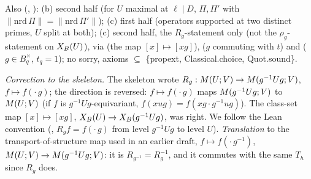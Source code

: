 \begin{proposition}[relations]
Also \stformal{} (, ): (b) second half 
(for $U$ maximal at $\ell\mid D$, $\Pi,\Pi'$ with $\|\mathrm{nrd}\,\Pi\|=\|\mathrm{nrd}\,\Pi'\|$); (c) first half
 (operators supported at two distinct primes, $U$ split at both); (c) second half, the
$R_g$-statement only (not the $\rho_g$-statement on $X_B(U)$), via  (the map $[x]\mapsto[xg]$),
 ($g$ commuting with $t$) and 
($g\in B_q^\times$, $t_q=1$); no sorry, axioms $\subseteq$ \{propext, Classical.choice, Quot.sound\}.
\end{proposition}
\noindent\emph{Correction to the skeleton.} The skeleton wrote $R_g:M(U;V)\to M(g^{-1}Ug;V)$, $f\mapsto f(\cdot\,g)$;
the direction is reversed: $f\mapsto f(\cdot\,g)$ maps $M(g^{-1}Ug;V)$ to $M(U;V)$ (if $f$ is $g^{-1}Ug$-equivariant,
$f(xug)=f(xg\cdot g^{-1}ug)$). The class-set map $[x]\mapsto[xg]$, $X_B(U)\to X_B(g^{-1}Ug)$, was right. We follow the Lean
convention (, $R_gf=f(\cdot\,g)$ from level $g^{-1}Ug$ to level $U$). \emph{Translation}
to the transport-of-structure map used in an earlier draft, $f\mapsto f(\cdot\,g^{-1})$, $M(U;V)\to M(g^{-1}Ug;V)$: it is
$R_{g^{-1}}=R_g^{-1}$, and it commutes with the same $T_h$ since $R_g$ does.
